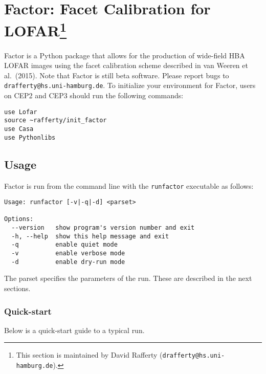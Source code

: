 \documentclass[structabstract]{article}
\begin{document}

\section[Factor: Facet Calibration for LOFAR]{Factor: Facet Calibration for
LOFAR\footnote{This section is maintained by David Rafferty
({\tt drafferty@hs.uni-hamburg.de}).}}
\label{factor}

Factor is a Python package that allows for the production of wide-field HBA
LOFAR images using the facet calibration scheme described in van Weeren et al.\
(2015). Note that Factor is still beta software. Please report bugs to
{\tt drafferty@hs.uni-hamburg.de}. To initialize your environment for Factor,
users on CEP2 and CEP3 should run the following commands:
\begin{verbatim}
use Lofar
source ~rafferty/init_factor
use Casa
use Pythonlibs
\end{verbatim}

\subsection{Usage}
\label{factor:usage}

Factor is run from the command line with the {\tt runfactor} executable as
follows:
\begin{verbatim}
Usage: runfactor [-v|-q|-d] <parset>

Options:
  --version   show program's version number and exit
  -h, --help  show this help message and exit
  -q          enable quiet mode
  -v          enable verbose mode
  -d          enable dry-run mode
\end{verbatim}
The parset specifies the parameters of the run. These are described in the next
sections.

\subsubsection{Quick-start}
\label{factor:quick-start}
Below is a quick-start guide to a typical run.
\end{document}
